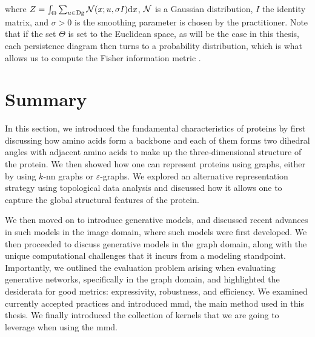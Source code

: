 where $Z=\int_{\Theta}\sum_{u\in\textnormal{Dg}}\mathcal{N}(x;u,\sigma I) \mathrm{d} x$, $\mathcal{N}$ is a
Gaussian distribution, $I$ the identity matrix, and $\sigma>0$ is the smoothing
parameter is chosen by the practitioner. Note that if the set $\Theta$ is set to
the Euclidean space, as will be the case in this thesis, each persistence
diagram then turns to a probability distribution, which is what allows us to
compute the Fisher information metric
\citep{anirudh2016riemannian,adams2017persistence}.

\section{Summary}

In this section, we introduced the fundamental characteristics of proteins by
first discussing how amino acids form a backbone and each of them forms two
dihedral angles with adjacent amino acids to make up the three-dimensional
structure of the protein. We then showed how one can represent proteins using
graphs, either by using $k$-nn graphs or $\varepsilon$-graphs. We explored an
alternative representation strategy using topological data analysis and
discussed how it allows one to capture the global structural features of the
protein.

We then moved on to introduce generative models, and discussed recent advances in
such models in the image domain, where such models were first developed. We then
proceeded to discuss generative models in the graph domain, along with the unique
computational challenges that it incurs from a modeling standpoint.
Importantly, we outlined the evaluation problem arising when evaluating
generative networks, specifically in the graph domain, and highlighted the
desiderata for good metrics: expressivity, robustness, and efficiency. We examined
currently accepted practices and introduced \acrshort{mmd}, the main
method used in this thesis. We finally introduced the collection of kernels that
we are going to leverage when using the \acrshort{mmd}.
